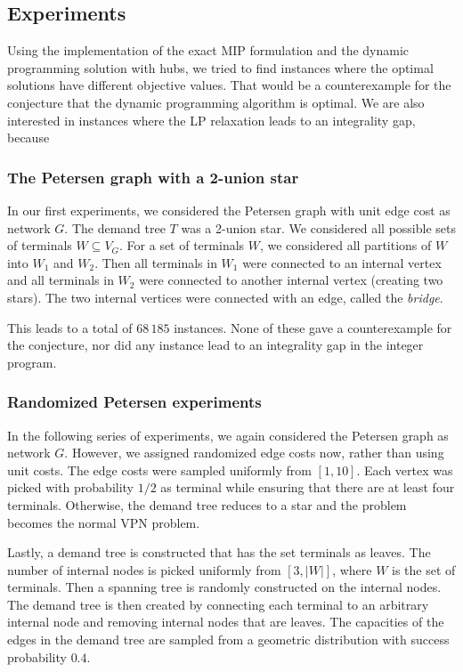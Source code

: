 \subsection{Experiments}
Using the implementation of the exact MIP formulation and the dynamic programming solution with hubs, we tried to find instances where the optimal solutions have different objective values.
That would be a counterexample for the conjecture that the dynamic programming algorithm is optimal.
We are also interested in instances where the LP relaxation leads to an integrality gap, because %

\subsubsection{The Petersen graph with a 2-union star}
In our first experiments, we considered the Petersen graph with unit edge cost as network $G$.
The demand tree $T$ was a 2-union star.
We considered all possible sets of terminals $W \subseteq V_G$.
For a set of terminals $W$, we considered all partitions of $W$ into $W_1$ and $W_2$.
Then all terminals in $W_1$ were connected to an internal vertex and all terminals in $W_2$ were connected to another internal vertex (creating two stars).
The two internal vertices were connected with an edge, called the \emph{bridge}.

This leads to a total of $68\,185$ instances.
None of these gave a counterexample for the conjecture, nor did any instance lead to an integrality gap in the integer program.

\subsubsection{Randomized Petersen experiments}\label{subsubsec:random}
In the following series of experiments, we again considered the Petersen graph as network $G$.
However, we assigned randomized edge costs now, rather than using unit costs.
The edge costs were sampled uniformly from $[1, 10]$.
Each vertex was picked with probability $1/2$ as terminal while ensuring that there are at least four terminals.
Otherwise, the demand tree reduces to a star and the problem becomes the normal VPN problem.

Lastly, a demand tree is constructed that has the set terminals as leaves.
The number of internal nodes is picked uniformly from $[3, |W|]$, where $W$ is the set of terminals.
Then a spanning tree is randomly constructed on the internal nodes.
The demand tree is then created by connecting each terminal to an arbitrary internal node and removing internal nodes that are leaves.
The capacities of the edges in the demand tree are sampled from a geometric distribution with success probability $0.4$.

